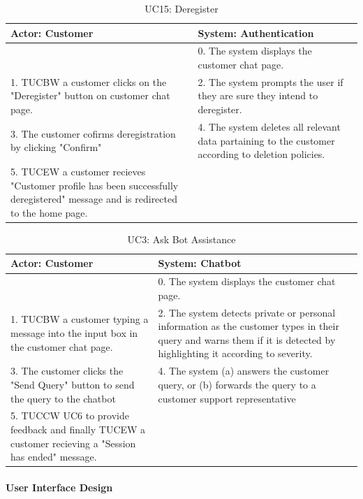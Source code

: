 \documentclass[11pt]{article}
\begin{document}
\begin{table}[H]
	\centering
	\begin{tabular}{|p{8cm}|p{8cm}|}
		\hline
		Actor: Customer & System: Authentication\\
		\hline
		 & 0. The system displays the customer chat page. \\
		\hline
		1. TUCBW a customer clicks on the "Deregister" button on customer chat page. & 2. The system prompts the user if they are sure they intend to deregister. \\
		\hline
		3. The customer cofirms deregistration by clicking "Confirm" & 4. The system deletes all relevant data partaining to the customer according to deletion policies.\\
		\hline
		5. TUCEW a customer recieves "Customer profile has been successfully deregistered" message and is redirected to the home page. & \\
		\hline
	\end{tabular}
	\caption{UC15: Deregister}
\end{table}

\begin{table}[H]
	\centering
	\begin{tabular}{|p{8cm}|p{8cm}|}
		\hline
		Actor: Customer & System: Chatbot \\
		\hline
		 & 0. The system displays the customer chat page. \\
		\hline
		1. TUCBW a customer typing a message into the input box in the customer chat page. & 2. The system detects private or personal information as the customer types in their query and warns them if it is detected by highlighting it according to severity. \\
		\hline
		3. The customer clicks the "Send Query" button to send the query to the chatbot & 4. 	The system (a) answers the customer query, or (b) forwards the query to a customer support representative \\
		\hline
		5. TUCCW UC6 to provide feedback and finally TUCEW a customer recieving a "Session has ended" message. & \\
		\hline
	\end{tabular}
	\caption{UC3: Ask Bot Assistance}
\end{table}

\paragraph{User Interface Design}
\end{document}
